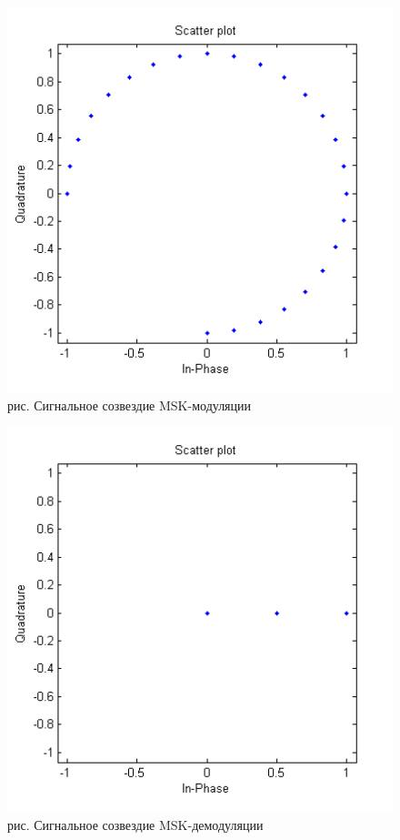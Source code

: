 \documentclass[10pt,a4paper]{report}
\begin{document}
\begin{figure}
\begin{center}
\includegraphics[width=150mm, scale = 0.9]{9_9}\newline
рис.  Сигнальное созвездие MSK-модуляции\newline
\end{center}
\end{figure}
\begin{figure}
\begin{center}
\includegraphics[width=150mm, scale = 0.9]{9_10}\newline
рис. Сигнальное созвездие MSK-демодуляции\newline
\end{center}
\end{figure}
\end{document}
